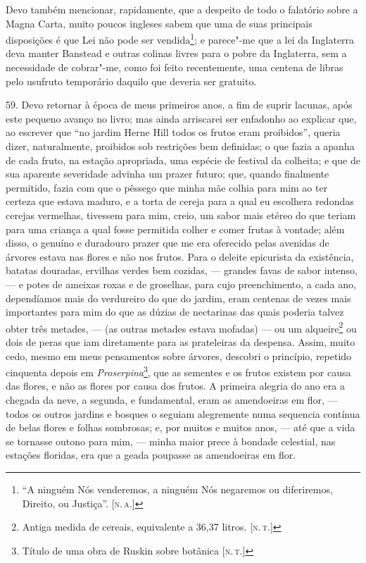 Devo também mencionar, rapidamente, que a despeito de todo o falatório
sobre a Magna Carta, muito poucos ingleses sabem que uma de suas
principais disposições é que Lei não pode ser vendida\footnote{``A
  ninguém Nós venderemos, a ninguém Nós negaremos ou diferiremos,
  Direito, ou Justiça''. {[}\textsc{n.\,a.}{]}}; e parece"-me que a lei da
Inglaterra deva manter Banstead e outras colinas livres para o pobre da
Inglaterra, sem a necessidade de cobrar"-me, como foi feito recentemente,
uma centena de libras pelo usufruto temporário daquilo que deveria ser
gratuito.

59. Devo retornar à época de meus primeiros anos, a fim de suprir
lacunas, após este pequeno avanço no livro; mas ainda arriscarei ser
enfadonho ao explicar que, ao escrever que ``no jardim Herne Hill todos
os frutos eram proibidos'', queria dizer, naturalmente, proibidos sob
restrições bem definidas; o que fazia a apanha de cada fruto, na estação
apropriada, uma espécie de festival da colheita; e que de sua aparente
severidade advinha um prazer futuro; que, quando finalmente permitido,
fazia com que o pêssego que minha mãe colhia para mim ao ter certeza que
estava maduro, e a torta de cereja para a qual eu escolhera redondas
cerejas vermelhas, tivessem para mim, creio, um sabor mais etéreo do que
teriam para uma criança a qual fosse permitida colher e comer frutas à
vontade; além disso, o genuíno e duradouro prazer que me era oferecido
pelas avenidas de árvores estava nas flores e não nos frutos. Para o
deleite epicurista da existência, batatas douradas, ervilhas verdes bem
cozidas, --- grandes favas de sabor intenso, --- e potes de ameixas roxas
e de groselhas, para cujo preenchimento, a cada ano, dependíamos mais do
verdureiro do que do jardim, eram centenas de vezes mais importantes
para mim do que as dúzias de nectarinas das quais poderia talvez obter
três metades, --- (as outras metades estava mofadas) --- ou um
alqueire\footnote{Antiga medida de cereais, equivalente a 36,37 litros.
  {[}\textsc{n.\,t.}{]}} ou dois de peras que iam diretamente para as
prateleiras da despensa. Assim, muito cedo, mesmo em meus pensamentos
sobre árvores, descobri o princípio, repetido cinquenta depois em
\emph{Proserpina}\footnote{Título de uma obra de Ruskin sobre botânica
  {[}\textsc{n.\,t.}{]}}, que as sementes e os frutos existem por causa das
flores, e não as flores por causa dos frutos. A primeira alegria do ano
era a chegada da neve, a segunda, e fundamental, eram as amendoeiras em
flor, --- todos os outros jardins e bosques o seguiam alegremente numa
sequencia contínua de belas flores e folhas sombrosas; e, por muitos e
muitos anos, --- até que a vida se tornasse outono para mim, --- minha
maior prece à bondade celestial, nas estações floridas, era que a geada
poupasse as amendoeiras em flor.

